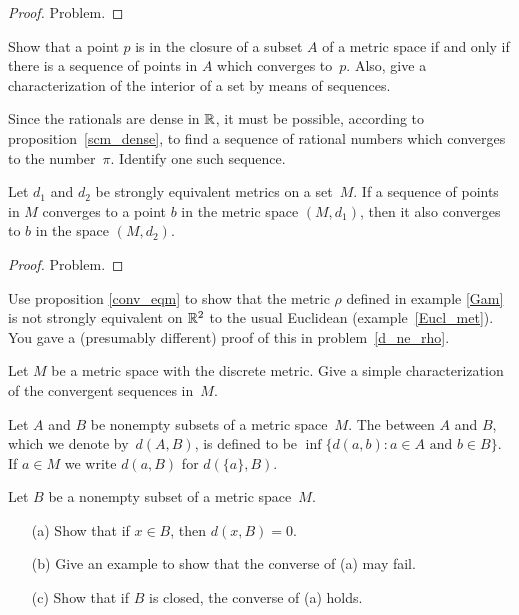 \begin{proof} Problem. \ns \end{proof}

\begin{prob}\label{prob_clo_seq} Show that a point $p$ is in the closure of a subset $A$ of a
metric space if and only if there is a sequence of points in $A$ which converges to~$p$.
Also, give a characterization of the interior of a set by means of sequences.
\end{prob}

\begin{prob} Since the rationals are dense in $\mathbb{R}$, it must be possible, according to
proposition~\ref{scm_dense}, to find a sequence of rational numbers which converges to the
number~$\pi$. Identify one such sequence.
\end{prob}

\begin{prop}\label{conv_eqm} Let $d_1$ and $d_2$ be strongly equivalent metrics on a
set~$M$.  If a sequence of points in $M$ converges to a point $b$ in the metric space
$(M,d_1)$, then it also converges to $b$ in the space $(M,d_2)$.
\end{prop}

\begin{proof} Problem. \ns \end{proof}

\begin{prob} Use proposition \ref{conv_eqm} to show that the metric $\rho$ defined in example
\ref{Gam} is not strongly equivalent on $\mathbb{R}^2$ to the usual Euclidean
(example~\ref{Eucl_met}). You gave a (presumably different) proof of this in
problem~\ref{d_ne_rho}.
\end{prob}

\begin{prob} Let $M$ be a metric space with the discrete metric.  Give a simple characterization
of the convergent sequences in~$M$.
\end{prob}

\begin{defn}\label{dist_sets} Let $A$ and $B$ be nonempty subsets of a metric space~$M$.  The
 between $A$ and $B$, which we denote
by~$d(A,B)$, is defined to be $\inf\{d(a,b) \colon a \in A \text{ and } b \in B\}$. If $a \in
M$ we write $d(a,B)$ for $d(\{a\},B)$.
\end{defn}

\begin{prob}\label{dist_sets_prob} Let $B$ be a nonempty subset of a metric space~$M$.
 \begin{enumerate}
  \item[(a)] Show that if $x \in B$, then $d(x,B) = 0$.
  \item[(b)] Give an example to show that the converse of (a) may fail.
  \item[(c)] Show that if $B$ is closed, the converse of (a) holds.
 \end{enumerate}
\end{prob}







